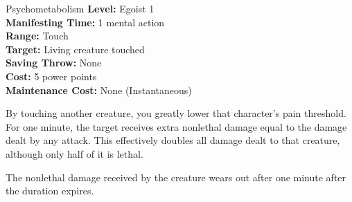 {Psychometabolism}
{
	\textbf{Level:}
	Egoist 1\\
	\textbf{Manifesting Time:}
	1 mental action\\
	\textbf{Range:}
	Touch\\
	\textbf{Target:}
	Living creature touched\\
	\textbf{Saving Throw:}
	None\\
	\textbf{Cost:}
	5 power points\\
	\textbf{Maintenance Cost:}
	None (Instantaneous)\\
}
{
	By touching another creature, you greatly lower that character's pain threshold. For one minute, the target receives extra nonlethal damage equal to the damage dealt by any attack. This effectively doubles all damage dealt to that creature, although only half of it is lethal.

	The nonlethal damage received by the creature wears out after one minute after the duration expires.
}